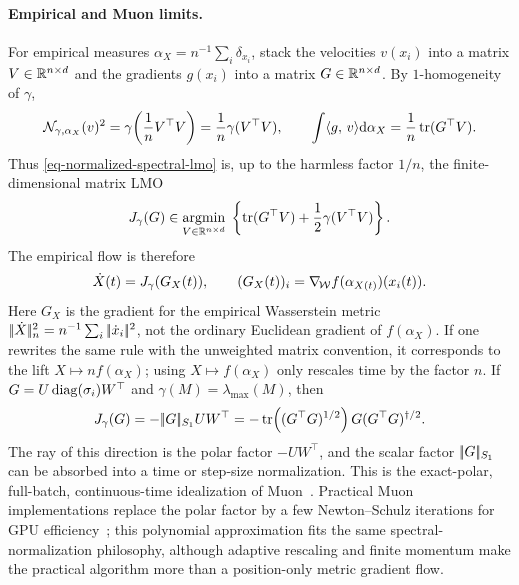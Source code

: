 \paragraph{Empirical and Muon limits.}
For empirical measures $\alpha_X=n^{-1}\sum_i\delta_{x_i}$, stack the velocities $v(x_i)$ into a matrix $V\in\mathbb{R}^{n\times d}$ and the gradients $g(x_i)$ into a matrix $G\in\mathbb{R}^{n\times d}$. By $1$-homogeneity of $\gamma$,
\[
	\mathcal N_{\gamma,\alpha_X}(v)^2
	=
	\gamma\!\left(\frac1n V^\top V\right)
	=
	\frac1n\gamma(V^\top V),
	\qquad
	\int\langle g,\,v\rangle\mathrm{d}\alpha_X
	=
	\frac1n\operatorname{tr}(G^\top V).
\]
Thus \eqref{eq-normalized-spectral-lmo} is, up to the harmless factor $1/n$, the finite-dimensional matrix LMO
\begin{equation}\label{eq-normalized-matrix-lmo}
	J_\gamma(G)
	\in
	\underset{V\in\mathbb{R}^{n\times d}}{\operatorname{argmin}}\;
	\left\{
		\operatorname{tr}(G^\top V)+\frac12\gamma(V^\top V)
	\right\}.
\end{equation}
The empirical flow is therefore
\[
	\dot X(t)=J_\gamma(G_X(t)),
	\qquad
	(G_X(t))_i=\nabla_{\!\operatorname{\mathcal{W}}} f(\alpha_{X(t)})(x_i(t)).
\]
Here $G_X$ is the gradient for the empirical Wasserstein metric $|\!| \dot X |\!|_n^2=n^{-1}\sum_i|\!| \dot x_i |\!|^2$, not the ordinary Euclidean gradient of $f(\alpha_X)$. If one rewrites the same rule with the unweighted matrix convention, it corresponds to the lift $X\mapsto n f(\alpha_X)$; using $X\mapsto f(\alpha_X)$ only rescales time by the factor $n$.
If $G=U\operatorname{diag}(\sigma_i)W^\top$ and $\gamma(M)=\lambda_{\max}(M)$, then
\begin{equation}\label{eq-normalized-muon-lmo}
	J_\gamma(G)
	=
	-|\!| G |\!|_{S_1}UW^\top
	=
	-\operatorname{tr}\!\left((G^\top G)^{1/2}\right)G(G^\top G)^{\dagger/2}.
\end{equation}
The ray of this direction is the polar factor $-UW^\top$, and the scalar factor $|\!| G |\!|_{S_1}$ can be absorbed into a time or step-size normalization. This is the exact-polar, full-batch, continuous-time idealization of Muon~\cite{KellerJordan2024,peyre2026muon}. Practical Muon implementations replace the polar factor by a few Newton--Schulz iterations for GPU efficiency~\cite{LiuSuYaoEtAl2025}; this polynomial approximation fits the same spectral-normalization philosophy, although adaptive rescaling and finite momentum make the practical algorithm more than a position-only metric gradient flow.


